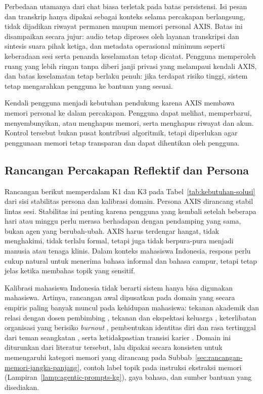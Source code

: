 Perbedaan utamanya dari chat biasa terletak pada batas persistensi. Isi pesan dan transkrip hanya dipakai sebagai konteks selama percakapan berlangsung, tidak dijadikan riwayat permanen maupun memori personal AXIS. Batas ini disampaikan secara jujur: audio tetap diproses oleh layanan transkripsi dan sintesis suara pihak ketiga, dan metadata operasional minimum seperti keberadaan sesi serta penanda keselamatan tetap dicatat. Pengguna memperoleh ruang yang lebih ringan tanpa diberi janji privasi yang melampaui kendali AXIS, dan batas keselamatan tetap berlaku penuh: jika terdapat risiko tinggi, sistem tetap mengarahkan pengguna ke bantuan yang sesuai.
\label{subsec:rancangan-confession-space}

Kendali pengguna menjadi kebutuhan pendukung karena AXIS membawa memori personal ke dalam percakapan. Pengguna dapat melihat, memperbarui, menyembunyikan, atau menghapus memori, serta menghapus riwayat dan akun. Kontrol tersebut bukan pusat kontribusi algoritmik, tetapi diperlukan agar penggunaan memori tetap transparan dan dapat dihentikan oleh pengguna.

\subsection{Rancangan Percakapan Reflektif dan Persona}
\label{sec:rancangan-percakapan-persona}
\label{sec:rancangan-axis}

Rancangan berikut memperdalam K1 dan K3 pada Tabel~\ref{tab:kebutuhan-solusi} dari sisi stabilitas persona dan kalibrasi domain. Persona AXIS dirancang stabil lintas sesi. Stabilitas ini penting karena pengguna yang kembali setelah beberapa hari atau minggu perlu merasa berhadapan dengan pendamping yang sama, bukan agen yang berubah-ubah. AXIS harus terdengar hangat, tidak menghakimi, tidak terlalu formal, tetapi juga tidak berpura-pura menjadi manusia atau tenaga klinis. Dalam konteks mahasiswa Indonesia, respons perlu cukup natural untuk menerima bahasa informal dan bahasa campur, tetapi tetap jelas ketika membahas topik yang sensitif.

Kalibrasi mahasiswa Indonesia tidak berarti sistem hanya bisa digunakan mahasiswa. Artinya, rancangan awal dipusatkan pada domain yang secara empiris paling banyak muncul pada kehidupan mahasiswa: tekanan akademik dan relasi dengan dosen pembimbing \parencite{pusparini2025thesisstress}, tekanan dan ekspektasi keluarga \parencite{mardhiyah2026parentalpressure}, keterlibatan organisasi yang berisiko \textit{burnout} \parencite{octaviani2023organizationalburnout,haase2025feelingseen}, pembentukan identitas diri dan rasa tertinggal dari teman seangkatan \parencite{pakozdy2024impostor,habibie2023quarterlifecrisis}, serta ketidakpastian transisi karier \parencite{yang2025employmentanxiety}. Domain ini diturunkan dari literatur tersebut, lalu dipakai secara konsisten untuk memengaruhi kategori memori yang dirancang pada Subbab~\ref{sec:rancangan-memori-jangka-panjang}, contoh label topik pada instruksi ekstraksi memori (Lampiran~\ref{lamp:agentic-prompts-kg}), gaya bahasa, dan sumber bantuan yang disediakan.

